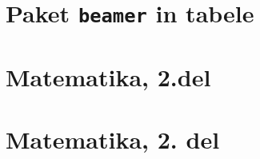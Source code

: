 \documentclass{beamer}
\begin{document}
    

\section{Paket \texttt{beamer} in tabele}


\section{Matematika, 2.del}

   
    

\section[Matematika, 2. del\\\large{Zaporedja, algebra, grupe}]{Matematika, 2. del}

    
\end{document}
